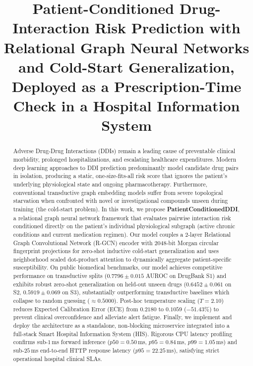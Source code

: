 \documentclass[conference]{IEEEtran}
\begin{document}
\title{Patient-Conditioned Drug-Interaction Risk Prediction with Relational Graph Neural Networks and Cold-Start Generalization, Deployed as a Prescription-Time Check in a Hospital Information System}

\author{
\and
{}
}

\maketitle

\begin{abstract}
Adverse Drug-Drug Interactions (DDIs) remain a leading cause of preventable clinical morbidity, prolonged hospitalizations, and escalating healthcare expenditures. Modern deep learning approaches to DDI prediction predominantly model candidate drug pairs in isolation, producing a static, one-size-fits-all risk score that ignores the patient's underlying physiological state and ongoing pharmacotherapy. Furthermore, conventional transductive graph embedding models suffer from severe topological starvation when confronted with novel or investigational compounds unseen during training (the cold-start problem). In this work, we propose \textbf{PatientConditionedDDI}, a relational graph neural network framework that evaluates pairwise interaction risk conditioned directly on the patient's individual physiological subgraph (active chronic conditions and current medication regimen). Our model couples a 2-layer Relational Graph Convolutional Network (R-GCN) encoder with 2048-bit Morgan circular fingerprint projections for zero-shot inductive cold-start generalization and uses neighborhood scaled dot-product attention to dynamically aggregate patient-specific susceptibility. On public biomedical benchmarks, our model achieves competitive performance on transductive splits ($0.7796 \pm 0.015$ AUROC on DrugBank S1) and exhibits robust zero-shot generalization on held-out unseen drugs ($0.6452 \pm 0.061$ on S2, $0.5919 \pm 0.069$ on S3), substantially outperforming transductive baselines which collapse to random guessing ($\approx 0.5000$). Post-hoc temperature scaling ($T=2.10$) reduces Expected Calibration Error (ECE) from $0.2180$ to $0.1059$ ($-51.43\%$) to prevent clinical overconfidence and alleviate alert fatigue. Finally, we implement and deploy the architecture as a standalone, non-blocking microservice integrated into a full-stack Smart Hospital Information System (HIS). Rigorous CPU latency profiling confirms sub-$1$\,ms forward inference ($p50 = 0.50$\,ms, $p95 = 0.84$\,ms, $p99 = 1.05$\,ms) and sub-$25$\,ms end-to-end HTTP response latency ($p95 = 22.25$\,ms), satisfying strict operational hospital clinical SLAs.
\end{abstract}
\end{document}
